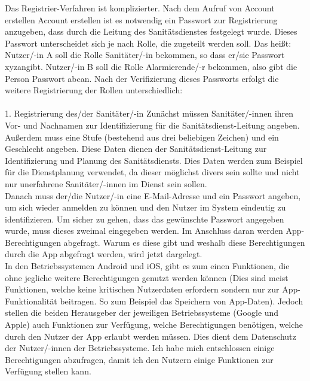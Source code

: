         Das Registrier-Verfahren ist komplizierter. Nach dem Aufruf von \glqq Account erstellen\grqq{}
        Account erstellen ist es notwendig ein Passwort zur Registrierung anzugeben, dass
        durch die Leitung des Sanitätsdienstes festgelegt wurde. Dieses Passwort unterscheidet sich
        je nach Rolle, die zugeteilt werden soll. Das heißt: Nutzer/-in A soll die 
        Rolle Sanitäter/-in bekommen, so dass er/sie Passwort \glqq xyz\grqq angibt.
        Nutzer/-in B soll die Rolle Alarmierende/-r bekommen, also gibt die Person 
        Passwort \glqq abc\grqq an.
        \newline
        Nach der Verifizierung dieses Passworts erfolgt die weitere Registrierung der Rollen unterschiedlich: 
        \\\\
        1. Registrierung des/der Sanitäter/-in
        \newline Zunächst müssen Sanitäter/-innen ihren Vor- und Nachnamen zur 
        Identifizierung für die Sanitätsdienst-Leitung angeben. Außerdem muss eine 
        Stufe (bestehend aus drei beliebigen Zeichen) und ein Geschlecht angeben. 
        Diese Daten dienen der Sanitätsdienst-Leitung zur Identifizierung und Planung
        des Sanitätsdiensts. Dies Daten werden zum Beispiel für die Dienstplanung
        verwendet, da dieser möglichst divers sein sollte und nicht nur unerfahrene Sanitäter/-innen
        im Dienst sein sollen.\\ Danach muss der/die Nutzer/-in eine E-Mail-Adresse und
        ein Passwort angeben, um sich wieder anmelden zu können und den Nutzer im 
        System eindeutig zu identifizieren. Um sicher zu gehen, dass das gewünschte Passwort angegeben wurde,
        muss dieses zweimal eingegeben werden.
        Im Anschluss daran werden App-Berechtigungen abgefragt. Warum es diese
        gibt und weshalb diese Berechtigungen durch die App abgefragt werden, wird jetzt dargelegt.\\
        In den Betriebssystemen Android und iOS, gibt es zum einen Funktionen, die 
        ohne jegliche weitere Berechtigungen genutzt werden können (Dies 
        sind meist Funktionen, welche keine kritischen Nutzerdaten erfordern sondern
        nur zur App-Funktionalität beitragen. So zum Beispiel das Speichern von
        App-Daten). Jedoch stellen die beiden Herausgeber der jeweiligen Betriebssysteme 
        (Google und Apple) auch Funktionen zur Verfügung, welche Berechtigungen benötigen, 
        welche durch den Nutzer der App erlaubt werden müssen. Dies dient dem Datenschutz 
        der Nutzer/-innen der Betriebssysteme. Ich habe mich entschlossen einige 
        Berechtigungen abzufragen, damit ich den Nutzern einige Funktionen zur Verfügung 
        stellen kann. \\
        
